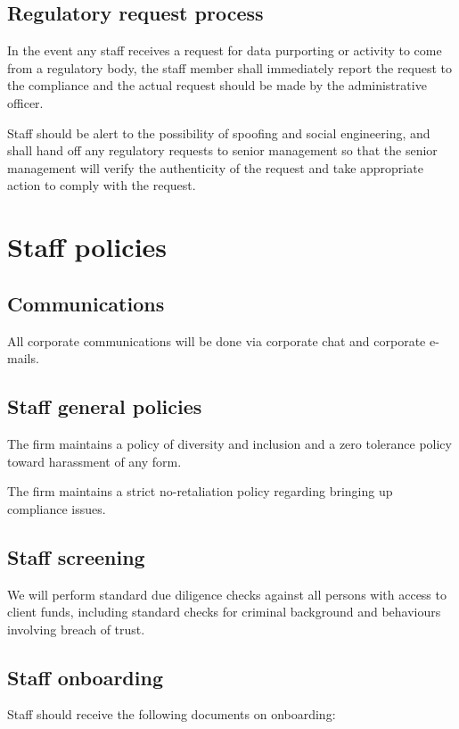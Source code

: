 \subsection{Regulatory request process}
\label{label:regrequest}
In the event any staff receives a request for data purporting or
activity to come from a regulatory body, the staff member shall
immediately report the request to the compliance and the actual
request should be made by the administrative officer.

Staff should be alert to the possibility of spoofing and social
engineering, and shall hand off any regulatory requests to senior
management so that the senior management will verify the authenticity
of the request and take appropriate action to comply with the request.

\section{Staff policies}

\subsection{Communications}
All corporate communications will be done via corporate chat and
corporate e-mails.

\subsection{Staff general policies}

The firm maintains a policy of diversity and inclusion and a zero
tolerance policy toward harassment of any form.

The firm maintains a strict no-retaliation policy regarding bringing up
compliance issues.

\subsection{Staff screening}
We will perform standard due diligence checks against all persons with
access to client funds, including standard checks for criminal
background and behaviours involving breach of trust.

\subsection{Staff onboarding}

Staff should receive the following documents on onboarding:

